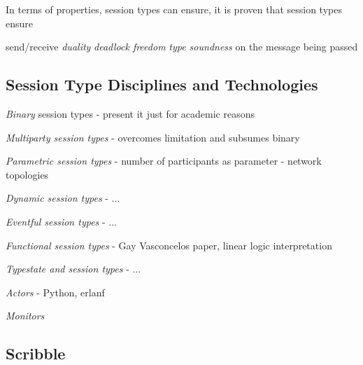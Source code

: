 In terms of properties, session types can ensure, it is proven
that session types ensure

send/receive {\em duality}
{\em deadlock freedom}
{\em type soundness} on the message being passed


\subsection{Session Type Disciplines and Technologies}


{\em Binary} session types - present it just for academic reasons

{\em Multiparty session types} - overcomes limitation and subsumes binary

{\em Parametric session types} - number of participants as parameter - network topologies

{\em Dynamic session types} - ...

{\em Eventful session types} - ...

{\em Functional session types} - Gay Vasconcelos paper, linear logic interpretation

{\em Typestate and session types} - ...

{\em Actors} - Python, erlanf

{\em Monitors}

\subsection{Scribble}
